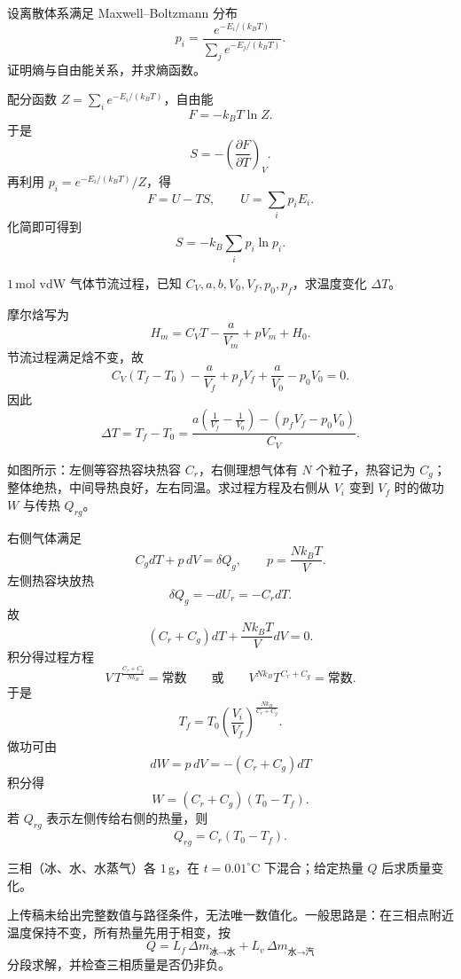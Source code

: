 \begin{question}
设离散体系满足 Maxwell--Boltzmann 分布
\[
p_i=\frac{e^{-E_i/(k_BT)}}{\sum_j e^{-E_j/(k_BT)}}.
\]
证明熵与自由能关系，并求熵函数。
\begin{solution}
配分函数 $Z=\sum_i e^{-E_i/(k_BT)}$，自由能
\[
F=-k_BT\ln Z.
\]
于是
\[
S=-\left(\frac{\partial F}{\partial T}\right)_V.
\]
再利用 $p_i=e^{-E_i/(k_BT)}/Z$，得
\[
F=U-TS,
\qquad U=\sum_i p_iE_i.
\]
化简即可得到
\[
S=-k_B\sum_i p_i\ln p_i.
\]
\end{solution}
\end{question}

\begin{question}
$1\,$mol vdW 气体节流过程，已知 $C_V,a,b,V_0,V_f,p_0,p_f$，求温度变化 $\Delta T$。
\begin{solution}
摩尔焓写为
\[
H_m=C_VT-\frac{a}{V_m}+pV_m+H_0.
\]
节流过程满足焓不变，故
\[
C_V(T_f-T_0)-\frac{a}{V_f}+p_fV_f+\frac{a}{V_0}-p_0V_0=0.
\]
因此
\[
\Delta T=T_f-T_0=\frac{a\left(\frac1{V_f}-\frac1{V_0}\right)-\left(p_fV_f-p_0V_0\right)}{C_V}.
\]
\end{solution}
\end{question}

\begin{question}
如图所示：左侧等容热容块热容 $C_r$，右侧理想气体有 $N$ 个粒子，热容记为 $C_g$；整体绝热，中间导热良好，左右同温。求过程方程及右侧从 $V_i$ 变到 $V_f$ 时的做功 $W$ 与传热 $Q_{rg}$。
\begin{solution}
右侧气体满足
\[
C_g dT+p\,dV=\delta Q_g,
\qquad p=\frac{Nk_BT}{V}.
\]
左侧热容块放热
\[
\delta Q_g=-dU_r=-C_r dT.
\]
故
\[
(C_r+C_g)dT+\frac{Nk_BT}{V}dV=0.
\]
积分得过程方程
\[
V\,T^{\frac{C_r+C_g}{Nk_B}}=\text{常数}
\qquad\text{或}\qquad
V^{Nk_B}T^{C_r+C_g}=\text{常数}.
\]
于是
\[
T_f=T_0\left(\frac{V_i}{V_f}\right)^{\frac{Nk_B}{C_r+C_g}}.
\]
做功可由
\[
dW=p\,dV=-(C_r+C_g)dT
\]
积分得
\[
W=(C_r+C_g)(T_0-T_f).
\]
若 $Q_{rg}$ 表示左侧传给右侧的热量，则
\[
Q_{rg}=C_r(T_0-T_f).
\]
\end{solution}
\end{question}

\begin{question}
三相（冰、水、水蒸气）各 $1\,$g，在 $t=0.01^\circ\mathrm C$ 下混合；给定热量 $Q$ 后求质量变化。
\begin{solution}
上传稿未给出完整数值与路径条件，无法唯一数值化。一般思路是：在三相点附近温度保持不变，所有热量先用于相变，按
\[
Q=L_f\,\Delta m_{\text{冰}\to\text{水}}+L_v\,\Delta m_{\text{水}\to\text{汽}}
\]
分段求解，并检查三相质量是否仍非负。
\end{solution}
\end{question}

